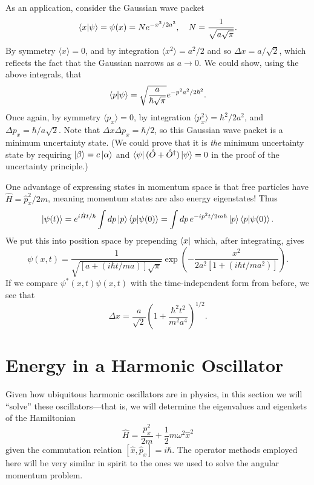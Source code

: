 \documentclass[../p116main.tex]{subfiles}
\begin{document}
As an application, consider the Gaussian wave packet
\[ \left< x \middle| \psi \right> = \psi(x) = N e^{-x^2 / 2a^2}, \quad N = \frac{1}{\sqrt{a \sqrt{\pi}}}. \]
By symmetry $\langle x \rangle = 0$, and by integration $\langle x^2 \rangle = a^2 / 2$ and so $\Delta x = a / \sqrt{2}$, which reflects the fact that the Gaussian narrows as $a \to 0$.
We could show, using the above integrals, that
\[ \left< p \middle| \psi \right> = \sqrt{\frac{a}{\hbar \sqrt{\pi}}} e^{-p^2 a^2 / 2\hbar^2}. \]
Once again, by symmetry $\langle p_x \rangle = 0$, by integration $\langle p_x^2 \rangle = \hbar^2 / 2a^2$, and $ \Delta p_x = \hbar / a \sqrt{2}$.
Note that $\Delta x \Delta p_x = \hbar / 2$, so this Gaussian wave packet is a minimum uncertainty state.
(We could prove that it is \textit{the} minimum uncertainty state by requiring $\left| \beta \right> = c \left| \alpha \right>$ and $\left< \psi \right| (\hat O + \hat O^\dagger) \left| \psi \right> = 0$ in the proof of the uncertainty principle.)

One advantage of expressing states in momentum space is that free particles have $\hat H = \hat p_x^2 / 2m$, meaning momentum states are also energy eigenstates!
Thus
\[ \left| \psi(t) \right> = e^{i \hat H t / \hbar} \int dp \left| p \right> \left< p \middle| \psi(0) \right> = \int dp \, e^{-ip^2 t / 2m\hbar} \left| p \right> \left< p \middle| \psi(0) \right>. \]
We put this into position space by prepending $\left< x \right|$ which, after integrating, gives
\[ \psi(x,t) = \frac{1}{\sqrt{[a + (i\hbar t / ma)] \sqrt{\pi}}} \exp \left( -\frac{x^2}{2a^2 [1 + (i\hbar t / ma^2)]} \right). \]
If we compare $\psi^*(x,t) \psi(x,t)$ with the time-independent form from before, we see that
\[ \Delta x = \frac{a}{\sqrt{2}} \left( 1 + \frac{\hbar^2 t^2}{m^2 a ^{4}} \right)^{1 / 2}. \]

\section{Energy in a Harmonic Oscillator}
Given how ubiquitous harmonic oscillators are in physics, in this section we will ``solve'' these oscillators---that is, we will determine the eigenvalues and eigenkets of the Hamiltonian
\[ \hat H = \frac{p_x^2}{2m} + \frac{1}{2} m \omega^2 \hat x^2 \]
given the commutation relation $[\hat x, \hat p_x] = i\hbar$.
The operator methods employed here will be very similar in spirit to the ones we used to solve the angular momentum problem.
\end{document}

